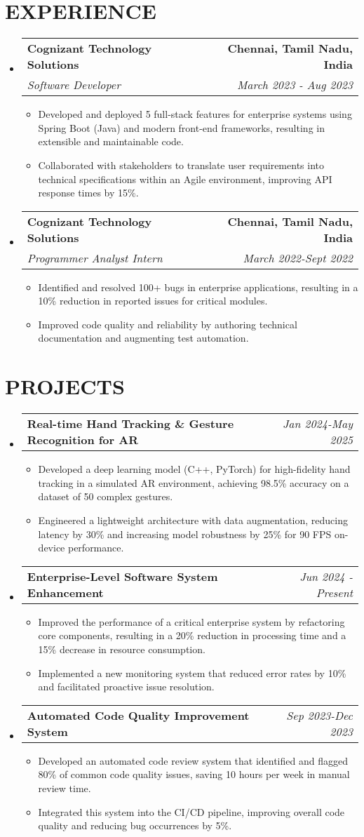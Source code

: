 \documentclass[letterpaper,11pt]{article}
\makeatletter
\newcommand{\resumeItem}[1]{\item\small{{#1 \vspace{-3pt}}}}
\newcommand{\resumeSubheading}[4]{\vspace{-2pt}\item\begin{tabular*}{0.97\textwidth}[t]{l@{\extracolsep{\fill}}r}\textbf{#1} & #2 \\\textit{\small#3} & \textit{\small #4} \\\end{tabular*}\vspace{-7pt}}
\newcommand{\resumeProjectHeading}[2]{\item\begin{tabular*}{0.97\textwidth}{l@{\extracolsep{\fill}}r}\small#1 & #2 \\\end{tabular*}\vspace{-7pt}}
\newcommand{\resumeSubHeadingListStart}{\begin{itemize}[leftmargin=0.15in, label={}]}
\newcommand{\resumeSubHeadingListEnd}{\end{itemize}}
\newcommand{\resumeItemListStart}{\begin{itemize}}
\newcommand{\resumeItemListEnd}{\end{itemize}\vspace{-5pt}}
\makeatother
\begin{document}
\section{{\fontsize{9pt}{20pt}\selectfont \textbf{EXPERIENCE}}}
\resumeSubHeadingListStart
\resumeSubheading{Cognizant Technology Solutions}{\textbf{Chennai, Tamil Nadu, India}}{Software Developer}{March 2023 - Aug 2023}
\resumeItemListStart
\resumeItem{Developed and deployed 5 full-stack features for enterprise systems using Spring Boot (Java) and modern front-end frameworks, resulting in extensible and maintainable code.}
\resumeItem{Collaborated with stakeholders to translate user requirements into technical specifications within an Agile environment, improving API response times by 15\%.}
\resumeItemListEnd
\resumeSubheading{Cognizant Technology Solutions}{\textbf{Chennai, Tamil Nadu, India}}{Programmer Analyst Intern}{March 2022-Sept 2022}
\resumeItemListStart
\resumeItem{Identified and resolved 100+ bugs in enterprise applications, resulting in a 10\% reduction in reported issues for critical modules.}
\resumeItem{Improved code quality and reliability by authoring technical documentation and augmenting test automation.}
\resumeItemListEnd
\resumeSubHeadingListEnd
\vspace{-17pt}

\section{{\fontsize{9pt}{20pt}\selectfont \textbf{PROJECTS}}}
\resumeSubHeadingListStart
\resumeProjectHeading{\textbf{Real-time Hand Tracking \& Gesture Recognition for AR}}{\textit{Jan 2024-May 2025}}
\resumeItemListStart
\resumeItem{Developed a deep learning model (C++, PyTorch) for high-fidelity hand tracking in a simulated AR environment, achieving 98.5\% accuracy on a dataset of 50 complex gestures.}
\resumeItem{Engineered a lightweight architecture with data augmentation, reducing latency by 30\% and increasing model robustness by 25\% for 90 FPS on-device performance.}
\resumeItemListEnd\vspace{-6pt}
\resumeProjectHeading{\textbf{Enterprise-Level Software System Enhancement}}{\textit{Jun 2024 - Present}}
\resumeItemListStart
\resumeItem{Improved the performance of a critical enterprise system by refactoring core components, resulting in a 20\% reduction in processing time and a 15\% decrease in resource consumption.}
\resumeItem{Implemented a new monitoring system that reduced error rates by 10\% and facilitated proactive issue resolution.}
\resumeItemListEnd\vspace{-6pt}
\resumeProjectHeading{\textbf{Automated Code Quality Improvement System}}{\textit{Sep 2023-Dec 2023}}
\resumeItemListStart
\resumeItem{Developed an automated code review system that identified and flagged 80\% of common code quality issues, saving 10 hours per week in manual review time.}
\resumeItem{Integrated this system into the CI/CD pipeline, improving overall code quality and reducing bug occurrences by 5\%.}
\resumeItemListEnd
\resumeSubHeadingListEnd
\vspace{-17pt}
\end{document}
